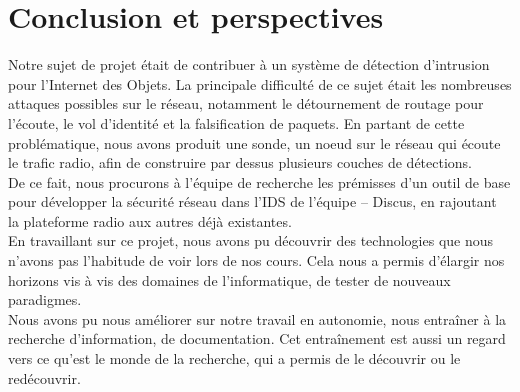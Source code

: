 \chapter*{Conclusion et perspectives}
\label{sec:conclusion}

    Notre sujet de projet était de contribuer à un système de détection d'intrusion pour l'Internet des Objets.
    La principale difficulté de ce sujet était les nombreuses attaques possibles sur le réseau, notamment le détournement de routage pour l'écoute, le vol d'identité et la falsification de paquets. En partant de cette problématique, nous avons produit une sonde, un noeud sur le réseau qui écoute le trafic radio, afin de construire par dessus plusieurs couches de détections.\\
    De ce fait, nous procurons à l'équipe de recherche les prémisses d'un outil de base pour développer la sécurité réseau dans l'IDS de l'équipe -- Discus, en rajoutant la plateforme radio aux autres déjà existantes.\\

	En travaillant sur ce projet, nous avons pu découvrir des technologies que nous n'avons pas l'habitude de voir lors de nos cours. Cela nous a permis d'élargir nos horizons vis à vis des domaines de l'informatique, de tester de nouveaux paradigmes.\\
	Nous avons pu nous améliorer sur notre travail en autonomie, nous entraîner à la recherche d'information, de documentation. Cet entraînement est aussi un regard vers ce qu'est le monde de la recherche, qui a permis de le découvrir ou le redécouvrir.
	


